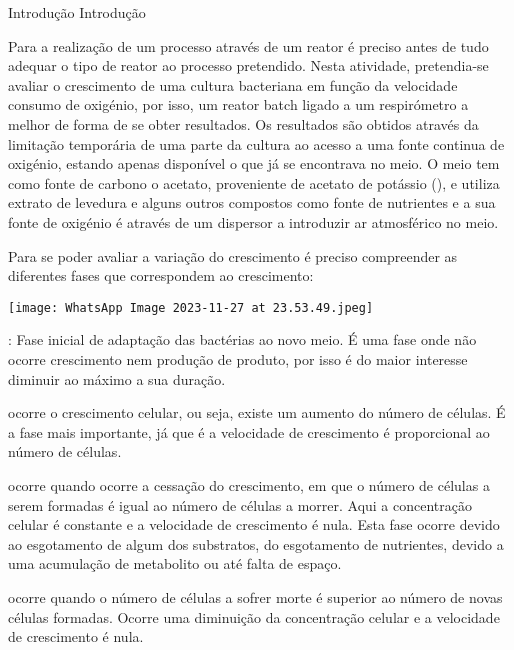 \documentclass[\mainfilename]{subfiles}
\begin{document}
\graphicspath{{\subfix{./.build/figures/EB-Relatorio.2}}}

{Introdução} %
{Introdução} %

Para a realização de um processo através de um reator é preciso antes de tudo adequar o tipo de reator ao processo pretendido. Nesta atividade, pretendia-se avaliar o crescimento de uma cultura bacteriana em função da velocidade consumo de oxigénio, por isso, um reator batch ligado a um respirómetro a melhor de forma de se obter resultados. Os resultados são obtidos através da limitação temporária de uma parte da cultura ao acesso a uma fonte continua de oxigénio, estando apenas disponível o  que já se encontrava no meio. O meio tem como fonte de carbono o acetato, proveniente de acetato de potássio (), e utiliza extrato de levedura e alguns outros compostos como fonte de nutrientes e a sua fonte de oxigénio é através de um dispersor a introduzir ar atmosférico no meio.\par
\vspace{1ex}
Para se poder avaliar a variação do crescimento é preciso compreender as diferentes fases que correspondem ao crescimento:
    
\begin{multicols}{2}
    \texttt{[image: WhatsApp Image 2023-11-27 at 23.53.49.jpeg]}
    
    \begin{description}[
        leftmargin=!,
        labelwidth=\widthof{} %
    ]
        \item[Fase ``lag'']: Fase inicial de adaptação das bactérias ao novo meio. É uma fase onde não ocorre crescimento nem produção de produto, por isso é do maior interesse diminuir ao máximo a sua duração.
        \item[Fase exponencial:] ocorre o crescimento celular, ou seja, existe um aumento do número de células. É a fase mais importante, já que é a velocidade de crescimento é proporcional ao número de células.
        \item[Fase estacionária:] ocorre quando ocorre a cessação do crescimento, em que o número de células a serem formadas é igual ao número de células a morrer. Aqui a concentração celular é constante e a velocidade de crescimento é nula. Esta fase ocorre devido ao esgotamento de algum dos substratos, do esgotamento de nutrientes, devido a uma acumulação de metabolito ou até falta de espaço.
        \item[Fase de morte:] ocorre quando o número de células a sofrer morte é superior ao número de novas células formadas. Ocorre uma diminuição da concentração celular e a velocidade de crescimento é nula.
    \end{description}
\end{multicols}
\end{document}
